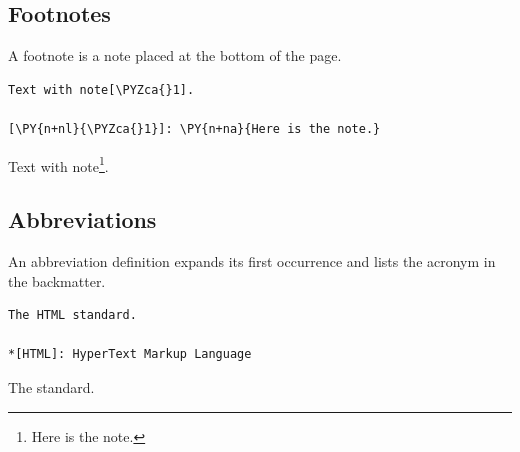 \documentclass[a4paper,twoside]{article}
\begin{document}
\subsection{Footnotes}
A footnote is a note placed at the bottom of the page.
\begin{tscode}[lang=md, engine=pygments]
\begin{Verbatim}[commandchars=\\\{\},breaklines, breakanywhere, commandchars=\\\{\}]
Text with note[\PYZca{}1].

[\PY{n+nl}{\PYZca{}1}]: \PY{n+na}{Here is the note.}
\end{Verbatim}
\end{tscode}
\begin{displayquote}
Text with note\footnote{Here is the note.}.
\end{displayquote}
\subsection{Abbreviations}
An abbreviation definition expands its first occurrence and lists the acronym in the backmatter.
\begin{tscode}[lang=md, engine=pygments]
\begin{Verbatim}[commandchars=\\\{\},breaklines, breakanywhere, commandchars=\\\{\}]
The HTML standard.

*[HTML]: HyperText Markup Language
\end{Verbatim}
\end{tscode}
\begin{displayquote}
The  standard.
\end{displayquote}
\end{document}
